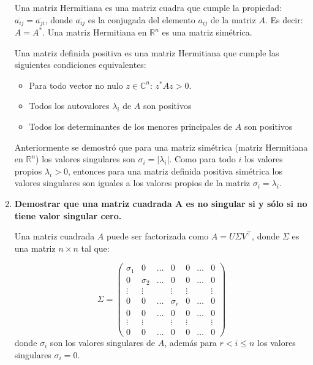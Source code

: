 \documentclass[12pt]{article}
\begin{document}
\begin{enumerate}
Una matriz Hermitiana es una matriz cuadra que cumple la propiedad: $\overline{a_{ij}} = \overline{a_{ji}}$, donde $\overline{a_{ij}}$ es la conjugada del elemento $a_{ij}$ de la matriz $A$. Es decir: $A = A^*$. Una matriz Hermitiana en $\mathbb{R}^n$ es una matriz simétrica.

Una matriz definida positiva es una matriz Hermitiana que cumple las siguientes condiciones equivalentes:

\begin{itemize}
\item Para todo vector no nulo $z \in \mathbb{C}^n$:  ${z}^{*} A z>0$.
\item Todos los autovalores $\lambda_{i}$ de $A$ son positivos
\item Todos los determinantes de los menores principales de $A$ son positivos
\end{itemize}

Anteriormente se demostró que para una matriz simétrica (matriz Hermitiana en $\mathbb{R}^n$) los valores singulares son $\sigma_i= \left | \lambda_i \right |$. Como para todo $i$ los valores propios $\lambda_i>0$, entonces para una matriz definida positiva simétrica los valores singulares son iguales a los valores propios de la matriz $\sigma_i = \lambda_i$.

\item \textbf{Demostrar que una matriz cuadrada A es no singular si y sólo si no tiene valor singular cero.}

Una matriz cuadrada $A$ puede ser factorizada como $A = U \Sigma V^\intercal$, donde $\Sigma$ es una matriz $n \times n$ tal que:

\begin{equation}
    \Sigma = 
    \begin{pmatrix}
        \sigma_1 &     0    & \dots &     0    &    0   & \dots &    0   \\
            0    & \sigma_2 & \dots &     0    &    0   & \dots &    0   \\
          \vdots &   \vdots &       &  \vdots  & \vdots &       & \vdots \\
            0    &     0    & \dots & \sigma_r &    0   & \dots &    0   \\
            0    &     0    & \dots &     0    &    0   & \dots &    0   \\
          \vdots &   \vdots &       &  \vdots  & \vdots &       & \vdots \\
            0    &     0    & \dots &     0    &    0   & \dots &    0  
    \end{pmatrix}
\end{equation}
donde $\sigma_i$ son los valores singulares de $A$, además para $r < i \leq n$ los valores singulares $\sigma_i = 0$.


\end{enumerate}
\end{document}
